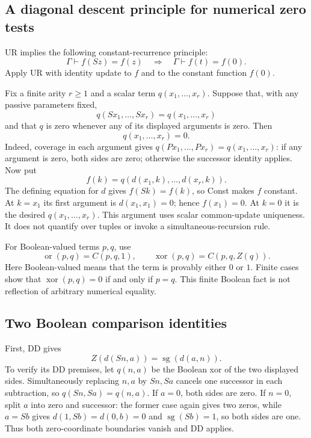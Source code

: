 \documentclass[11pt]{article}
\theoremstyle{definition}\newtheorem{definition}[theorem]{Definition}
\begin{document}
\subsection{A diagonal descent principle for numerical zero tests}

UR implies the following constant-recurrence principle:
\[
 \Gamma\vdash f(Sz)=f(z)\quad\Longrightarrow\quad
 \Gamma\vdash f(t)=f(0).
 \tag{Const}
\]
Apply UR with identity update to $f$ and to the constant function $f(0)$.

Fix a finite arity $r\geq1$ and a scalar term $q(x_1,\ldots,x_r)$.
Suppose that, with any passive parameters fixed,
\[
 q(Sx_1,\ldots,Sx_r)=q(x_1,\ldots,x_r)
\]
and that $q$ is zero whenever any of its displayed arguments is zero.
Then
\[
                         q(x_1,\ldots,x_r)=0.             \tag{DD}
\]
Indeed, coverage in each argument gives
$q(Px_1,\ldots,Px_r)=q(x_1,\ldots,x_r)$: if any argument is zero,
both sides are zero; otherwise the successor identity applies.
Now put
\[
 f(k)=q(d(x_1,k),\ldots,d(x_r,k)).
\]
The defining equation for $d$ gives $f(Sk)=f(k)$, so Const makes $f$
constant. At $k=x_1$ its first argument is $d(x_1,x_1)=0$; hence
$f(x_1)=0$. At $k=0$ it is the desired $q(x_1,\ldots,x_r)$.
This argument uses scalar common-update uniqueness. It does not quantify over
tuples or invoke a simultaneous-recursion rule.

For Boolean-valued terms $p,q$, use
\[
 \operatorname{or}(p,q)=C(p,q,1),\qquad
 \operatorname{xor}(p,q)=C(p,q,Z(q)).
\]
Here Boolean-valued means that the term is provably either $0$ or $1$.
Finite cases show that $\operatorname{xor}(p,q)=0$ if and only if $p=q$.
This finite Boolean fact is not reflection of arbitrary numerical equality.

\subsection{Two Boolean comparison identities}

First, DD gives
\[
 Z(d(Sn,a))=\operatorname{sg}(d(a,n)).
 \tag{B1}\label{eq:ur-strict-complement}
\]
To verify its DD premises, let $q(n,a)$ be the Boolean xor of the two
displayed sides. Simultaneously replacing $n,a$ by $Sn,Sa$ cancels one
successor in each subtraction, so $q(Sn,Sa)=q(n,a)$. If $a=0$, both
sides are zero. If $n=0$, split $a$ into zero and successor: the former
case again gives two zeros, while $a=Sb$ gives
$d(1,Sb)=d(0,b)=0$ and $\operatorname{sg}(Sb)=1$, so both sides are one.
Thus both zero-coordinate boundaries vanish and DD applies.
\end{document}
